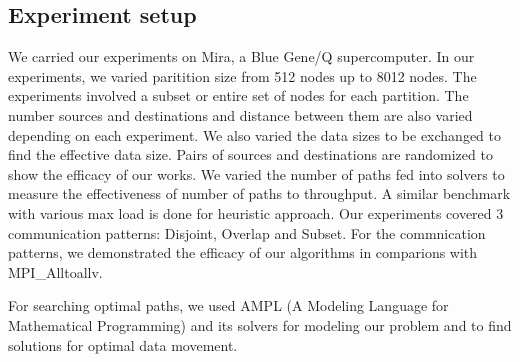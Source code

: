 \subsection{Experiment setup}

We carried our experiments on Mira, a Blue Gene/Q supercomputer. In our experiments, we varied paritition size from 512 nodes up to 8012 nodes. The experiments involved a subset or entire set of nodes for each partition. The number sources and destinations and distance between them are also varied depending on each experiment. We also varied the data sizes to be exchanged to find the effective data size. Pairs of sources and destinations are randomized to show the efficacy of our works. We varied the number of paths fed into solvers to measure the effectiveness of number of paths to throughput. A similar benchmark with various max load is done for heuristic approach. Our experiments covered 3 communication patterns: Disjoint, Overlap and Subset. For the commnication patterns, we demonstrated the efficacy of our algorithms in comparions with MPI\_Alltoallv.

For searching optimal paths, we used AMPL (A Modeling Language for Mathematical Programming) and its solvers \cite{AMPL} for modeling our problem and to find solutions for
 optimal data movement.
